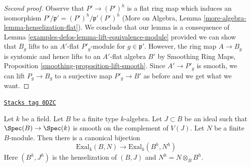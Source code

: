 \begin{proof}[Second proof]
\medskip\noindent
Observe that $P' \to (P')^h$ is a flat ring map which
induces an isomorphism $P'/\mathfrak p' = (P')^h/\mathfrak p'(P')^h$
(More on Algebra, Lemma \ref{more-algebra-lemma-henselization-flat}).
We conclude that our lemma is a consequence of
Lemma \ref{examples-defos-lemma-lift-equivalence-module} provided we can
show that $B_g$ lifts to an $A'$-flat $P'_g$-module for
$g \in \mathfrak p'$. However, the ring map $A \to B_g$ is syntomic
and hence lifts to an $A'$-flat algebra $B'$ by
Smoothing Ring Maps, Proposition \ref{smoothing-proposition-lift-smooth}.
Since $A' \to P'_g$ is smooth, we can lift $P_g \to B_g$
to a surjective map $P'_g \to B'$ as before and we get what we want.
\end{proof}

\begin{lemma}
\label{examples-defos-lemma-first-order-henselization}
\href{https://stacks.math.columbia.edu/tag/0DZC}{\texttt{Stacks tag 0DZC}}

Let $k$ be a field. Let $B$ be a finite type $k$-algebra.
Let $J \subset B$ be an ideal such that
$\Spec(B) \to \Spec(k)$ is smooth on the complement of $V(J)$.
Let $N$ be a finite $B$-module.
Then there is a canonical bijection
$$
\text{Exal}_k(B, N) \to \text{Exal}_k(B^h, N^h)
$$
Here $(B^h, J^h)$ is the henselization of $(B, J)$
and $N^h = N \otimes_B B^h$.
\end{lemma}

